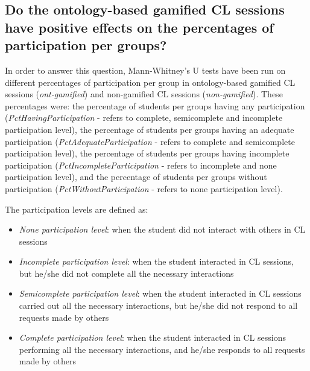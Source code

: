 \subsection*{Do the ontology-based gamified CL sessions have positive effects on the percentages of participation per groups?}

In order to answer this question, Mann-Whitney's U tests have been run on  different percentages of participation per group in ontology-based gamified CL sessions (\emph{ont-gamified}) and non-gamified CL sessions (\emph{non-gamified}). These percentages were: the percentage of students per groups having any participation (\emph{PctHavingParticipation} - refers to complete, semicomplete and incomplete participation level), the percentage of students per groups having an adequate participation (\emph{PctAdequateParticipation} - refers to complete and semicomplete participation level), the percentage of students per groups having incomplete participation (\emph{PctIncompleteParticipation} - refers to incomplete and none participation level), and the percentage of students per groups without participation (\emph{PctWithoutParticipation} - refers to none participation level).

The participation levels are defined as:
\begin{itemize}
\item
\emph{None participation level}: when the student did not interact with others in CL sessions
\item
\emph{Incomplete participation level}: when the student interacted in CL sessions, but he/she did not complete all the necessary interactions
\item
\emph{Semicomplete participation level}: when the student interacted in CL sessions carried out all the necessary interactions, but he/she did not respond to all requests made by others
\item
\emph{Complete participation level}: when the student interacted in CL sessions performing all the necessary interactions, and he/she responds to all requests made by others
\end{itemize}

